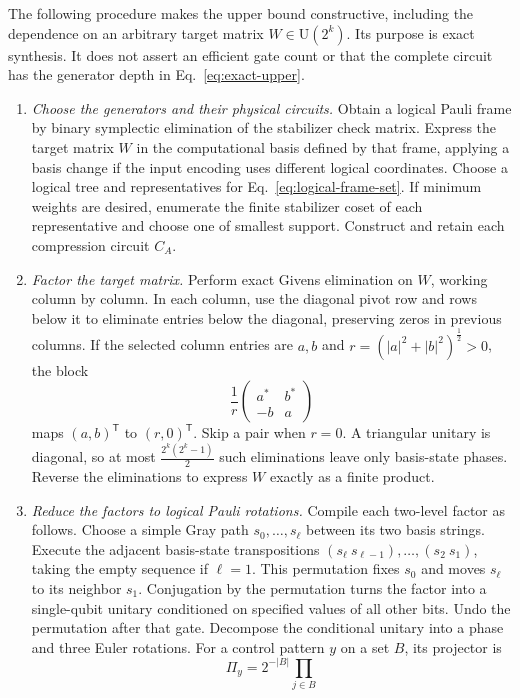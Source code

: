 \documentclass[aps,prl,reprint,notitlepage,nofootinbib,nobibnotes]{revtex4-2}
\newcommand{\UU}{\mathrm U}
\begin{document}
The following procedure makes the upper bound constructive, including the dependence on an
arbitrary target matrix $W\in\UU(2^k)$. Its purpose is exact synthesis. It does not assert an
efficient gate count or that the complete circuit has the generator depth in
Eq.~\eqref{eq:exact-upper}.
\begin{enumerate}
\item \emph{Choose the generators and their physical circuits.} Obtain a logical Pauli frame by
binary symplectic elimination of the stabilizer check matrix. Express the target matrix $W$ in the
computational basis defined by that frame, applying a basis change if the input encoding uses
different logical coordinates. Choose a logical tree and representatives for
Eq.~\eqref{eq:logical-frame-set}. If minimum weights are desired, enumerate the finite stabilizer
coset of each representative and choose one of smallest support. Construct and retain each
compression circuit $C_A$.
\item \emph{Factor the target matrix.} Perform exact Givens elimination on $W$, working column by
column. In each column, use the diagonal pivot row and rows below it to eliminate entries below the
diagonal, preserving zeros in previous columns. If the selected column entries are $a,b$ and
$r=(|a|^2+|b|^2)^{\frac{1}{2}}>0$, the block
\[
 \frac{1}{r}\begin{pmatrix}a^*&b^*\\-b&a\end{pmatrix}
\]
maps $(a,b)^\mathsf T$ to $(r,0)^\mathsf T$. Skip a pair when $r=0$. A triangular unitary is
diagonal, so at most $\frac{2^k(2^k-1)}{2}$ such eliminations leave only basis-state phases.
Reverse the eliminations to express $W$ exactly as a finite product.
\item \emph{Reduce the factors to logical Pauli rotations.} Compile each two-level factor as
follows. Choose a simple Gray path $s_0,\ldots,s_\ell$ between its two basis strings. Execute the
adjacent basis-state transpositions $(s_\ell\ s_{\ell-1}),\ldots,(s_2\ s_1)$, taking the empty
sequence if $\ell=1$. This permutation fixes $s_0$ and moves $s_\ell$ to its neighbor $s_1$.
Conjugation by the permutation turns the factor into a single-qubit unitary conditioned on
specified values of all other bits. Undo the permutation after that gate. Decompose the conditional
unitary into a phase and three Euler rotations. For a control pattern $y$ on a set $B$, its
projector is
\begin{equation}\label{eq:control-projector}
 \Pi_y=2^{-|B|}\prod_{j\in B}

\end{equation}
\end{enumerate}
\end{document}
